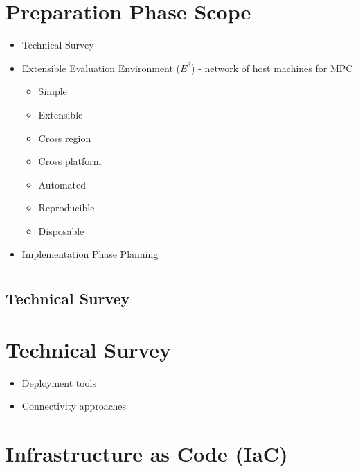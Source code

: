 \hypertarget{preparation-phase-scope}{%
\chapter{Preparation Phase Scope}\label{preparation-phase-scope}}

\begin{itemize}
\tightlist
\item
  Technical Survey
\item
  Extensible Evaluation Environment (\(E^3\)) - network of host machines
  for MPC

  \begin{itemize}
  \tightlist
  \item
    Simple
  \item
    Extensible
  \item
    Cross region
  \item
    Cross platform
  \item
    Automated
  \item
    Reproducible
  \item
    Disposable
  \end{itemize}
\item
  Implementation Phase Planning
\end{itemize}

\hypertarget{section}{%
\chapter{}\label{section}}

\section{Technical Survey}

\hypertarget{technical-survey}{%
\chapter{Technical Survey}\label{technical-survey}}

\begin{itemize}
\tightlist
\item
  Deployment tools
\item
  Connectivity approaches
\end{itemize}

\hypertarget{infrastructure-as-code-iac}{%
\chapter{Infrastructure as Code
(IaC)}\label{infrastructure-as-code-iac}}

